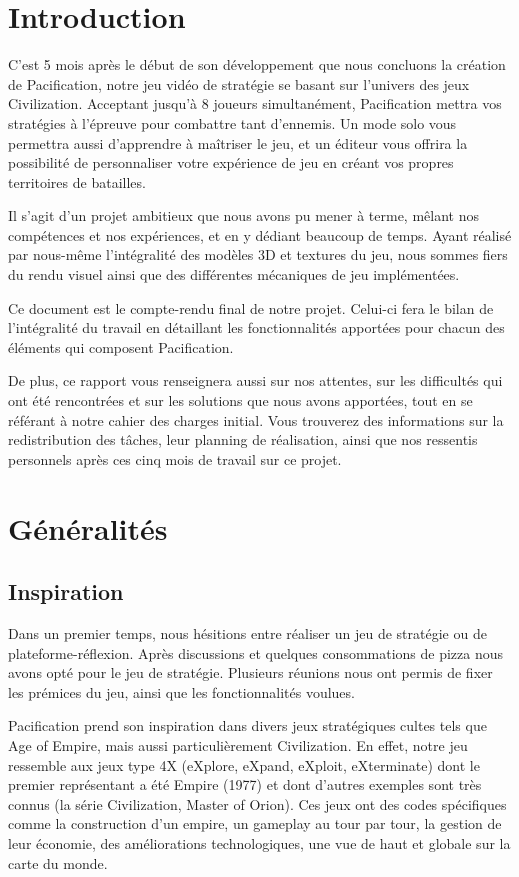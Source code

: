 \documentclass[12pt]{report}
\begin{document}
\chapter{Introduction}

C’est 5 mois après le début de son développement que nous concluons la création
de Pacification, notre jeu vidéo de stratégie se basant sur l’univers des jeux
Civilization. Acceptant jusqu'à 8 joueurs simultanément, Pacification mettra vos
stratégies à l’épreuve pour combattre tant d’ennemis. Un mode solo vous
permettra aussi d’apprendre à maîtriser le jeu, et un éditeur vous offrira la
possibilité de personnaliser votre expérience de jeu en créant vos propres
territoires de batailles.

Il s’agit d’un projet ambitieux que nous avons pu mener à terme, mêlant nos
compétences et nos expériences, et en y dédiant beaucoup de temps. Ayant réalisé
par nous-même l’intégralité des modèles 3D et textures du jeu, nous sommes fiers
du rendu visuel ainsi que des différentes mécaniques de jeu implémentées.

Ce document est le compte-rendu final de notre projet. Celui-ci fera le bilan de
l'intégralité du travail en détaillant les fonctionnalités apportées pour chacun
des éléments qui composent Pacification.

De plus, ce rapport vous renseignera aussi sur nos attentes, sur les difficultés
qui ont été rencontrées et sur les solutions que nous avons apportées, tout en
se référant à notre cahier des charges initial. Vous trouverez des informations
sur la redistribution des tâches, leur planning de réalisation, ainsi que nos
ressentis personnels après ces cinq mois de travail sur ce projet.

\chapter{Généralités}

\section{Inspiration}

Dans un premier temps, nous hésitions entre réaliser un jeu de stratégie ou de
plateforme-réflexion. Après discussions et quelques consommations de pizza nous
avons opté pour le jeu de stratégie. Plusieurs réunions nous ont permis de fixer
les prémices du jeu, ainsi que les fonctionnalités voulues.

Pacification prend son inspiration dans divers jeux stratégiques cultes tels que
Age of Empire, mais aussi particulièrement Civilization. En effet, notre jeu
ressemble aux jeux type 4X (eXplore, eXpand, eXploit, eXterminate) dont le
premier représentant a été Empire (1977) et dont d’autres exemples sont très
connus (la série Civilization, Master of Orion). Ces jeux ont des codes
spécifiques comme la construction d’un empire, un gameplay au tour par tour, la
gestion de leur économie, des améliorations technologiques, une vue de haut et
globale sur la carte du monde. 
\end{document}
